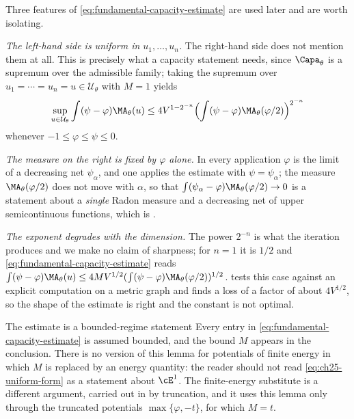 \begin{remark}
\label{rem:ch25-reading-fundamental}
Three features of \eqref{eq:fundamental-capacity-estimate} are used later and
are worth isolating.

\emph{The left-hand side is uniform in \(u_1,\ldots,u_n\).}  The right-hand
side does not mention them at all.  This is precisely what a capacity
statement needs, since \(\Capa_\theta\) is a supremum over the admissible
family; taking the supremum over \(u_1=\cdots=u_n=u\in\mathcal U_\theta\)
with \(M=1\) yields
\begin{equation}
\label{eq:ch25-uniform-form}
 \sup_{u\in\mathcal U_\theta}\int(\psi-\varphi)\MA_\theta(u)
 \leq4V^{1-2^{-n}}
 \Bigl(\int(\psi-\varphi)\MA_\theta(\varphi/2)\Bigr)^{2^{-n}}
\end{equation}
whenever \(-1\leq\varphi\leq\psi\leq0\).

\emph{The measure on the right is fixed by \(\varphi\) alone.}  In every
application \(\varphi\) is the limit of a decreasing net \(\psi_\alpha\), and
one applies the estimate with \(\psi=\psi_\alpha\); the measure
\(\MA_\theta(\varphi/2)\) does not move with \(\alpha\), so that
\(\int(\psi_\alpha-\varphi)\MA_\theta(\varphi/2)\to0\) is a statement about a
\emph{single} Radon measure and a decreasing net of upper semicontinuous
functions, which is .

\emph{The exponent degrades with the dimension.}  The power \(2^{-n}\) is
what the iteration produces and we make no claim of sharpness; for
\(n=1\) it is \(1/2\) and \eqref{eq:fundamental-capacity-estimate} reads
\(\int(\psi-\varphi)\MA_\theta(u)\leq4MV^{1/2}
(\int(\psi-\varphi)\MA_\theta(\varphi/2))^{1/2}\).
 tests this case against an explicit
computation on a metric graph and finds a loss of a factor of about
\(4V^{1/2}\), so the shape of the estimate is right and the constant is not
optimal.
\end{remark}

\begin{warning}{The estimate is a bounded-regime statement}
Every entry in \eqref{eq:fundamental-capacity-estimate} is assumed bounded,
and the bound \(M\) appears in the conclusion.  There is no version of this
lemma for potentials of finite energy in which \(M\) is replaced by an energy
quantity: the reader should not read \eqref{eq:ch25-uniform-form} as a
statement about \(\cE^1\).  The finite-energy substitute is a different
argument, carried out in
 by truncation, and it
uses this lemma only through the truncated potentials
\(\max\{\varphi,-t\}\), for which \(M=t\).
\end{warning}


